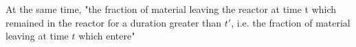 At the same time, "the fraction of material leaving the reactor at time t which remained in the reactor for a duration greater than $t'$, i.e. the fraction of material leaving at time $t$ which entere"  